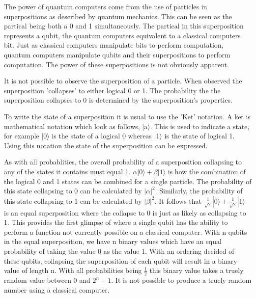 \documentclass[authoryearcitations]{UoYCSproject}
\begin{document}
The power of quantum computers come from the use of particles in superpositions as described by quantum mechanics.
This can be seen as the partical being both a 0 and 1 simultaneously.
The partical in this superposition represents a qubit, the quantum computers equivalent to a classical computers bit.
Just as classical computers manipulate bits to perform computation, quantum computers manipulate qubits and their superpositions to perform computation.
The power of these superpositions is not obviously apparent.

It is not possible to observe the superposition of a particle.
When observed the superposition 'collapses' to either logical 0 or 1.
The probability the the superposition collapses to 0 is determined by the superposition's properties.

To write the state of a superposition it is usual to use the 'Ket' notation.
A ket is mathematical notation which look as follows, |a$\rangle$.
This is used to indicate a state, for example |0$\rangle$ is the state of a logical 0 whereas |1$\rangle$ is the state of logical 1.
Using this notation the state of the superposition can be expressed.

As with all probablities, the overall probability of a superposition collapsing to any of the states it contains must equal 1.
$\alpha|0\rangle+\beta|1\rangle$ is how the combination of the logical 0 and 1 states can be combined for a single particle.
The probability of this state collapsing to 0 can be calculated by $|\alpha|^2$.
Similarly, the probability of this state collapsing to 1 can be calculated by $|\beta|^2$.
It follows that $\frac{1}{\sqrt{2}}|0\rangle+\frac{1}{\sqrt{2}}|1\rangle$ is an equal superposition where the collapse to 0 is just as likely as collapsing to 1.
This provides the first glimpse of where a single qubit has the ability to perform a function not currently possible on a classical computer.
With n-qubits in the equal superposition, we have n binary values which have an equal probability of taking the value 0 as the value 1.
With an ordering decided of these qubits, collapsing the superposition of each qubit will result in a binary value of length n.
With all probabilities being $\frac{1}{2}$ this binary value takes a truely random value between 0 and $2^n-1$.
It is not possible to produce a truely random number using a classical computer.
\end{document}
